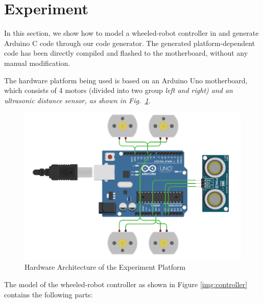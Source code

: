 \section{Experiment}
\label{sec:experiment}

In this section, we show how to model a wheeled-robot controller in \lang{} and generate Arduino C code through our code generator. The generated platform-dependent code has been directly compiled and flashed to the motherboard, without any manual modification.

The hardware platform being used is based on an Arduino Uno motherboard, which consists of 4 motors (divided into two group \em{left} and \em{right}) and an ultrasonic distance sensor, as shown in Fig.~\ref{img:circuits}.

\begin{figure}[!ht]
    \centering
        \includegraphics[width=.5\textwidth]{images/circuits.png}
    \caption{Hardware Architecture of the Experiment Platform}
    \label{img:circuits}
\end{figure}


The \lang{} model of the wheeled-robot controller as shown in Figure \ref{img:controller} contains the following parts:

